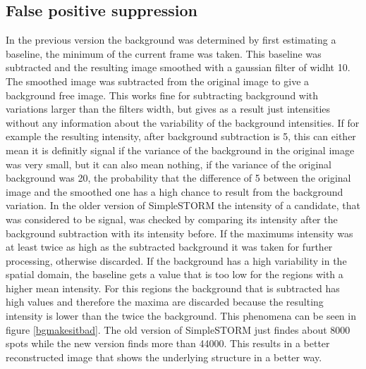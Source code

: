 \subsection{False positive suppression}
In the previous version the background was determined by first estimating a baseline, the minimum of the current frame was taken. This baseline was subtracted and the resulting image smoothed with a gaussian filter of widht 10. The smoothed image was subtracted from the original image to give a background free image. This works fine for subtracting background with variations larger than the filters width, but gives as a result just intensities without any information about the variability of the background intensities. If for example the resulting intensity, after background subtraction is 5, this can either mean it is definitly signal if the variance of the background in the original image was very small, but it can also mean nothing, if the variance of the original background was 20, the probability that the difference of 5 between the original image and the smoothed one has a high chance to result from the background variation.\newline
In the older version of SimpleSTORM the intensity of a candidate, that was considered to be signal, was checked by comparing its intensity after the background subtraction with its intensity before. If the maximums intensity was at least twice as high as the subtracted background it was taken for further processing, otherwise discarded. If the background has a high variability in the spatial domain, the baseline gets a value that is too low for the regions with a higher mean intensity. For this regions the background that is subtracted has high values and therefore the maxima are discarded because the resulting intensity is lower than the twice the background. This phenomena can be seen in figure \ref{bgmakesitbad}. The old version of SimpleSTORM just findes about 8000 spots while the new version finds more than 44000. This results in a better reconstructed image that shows the underlying structure in a better way.

